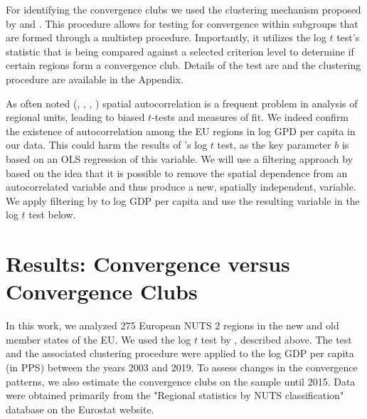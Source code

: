 \documentclass[11pt]{article}
\begin{document}
For identifying the convergence clubs we used the clustering mechanism proposed by \citet{phillips2009economic} and \citet{bartkowska2012regional}. This procedure allows for testing for convergence within subgroups that are formed through a multistep procedure. Importantly, it utilizes the log $t$ test's statistic that is being compared against a selected criterion level to determine if certain regions form a convergence club. Details of the test are and the clustering procedure are available in the Appendix.

As often noted (\citet{dall2008regional}, \citet{magrini2004regional}, \citet{anselin1991properties}, \citet{anselin2001spatial}) spatial autocorrelation is a frequent problem in analysis of regional units, leading to biased $t$-tests and measures of fit. We indeed confirm the existence of autocorrelation among the EU regions in log GPD per capita in our data. This could harm the results of \citeauthor{phillips2007transition}'s log $t$ test, as the key parameter $b$ is based on an OLS regression of this variable. We will use a filtering approach by \cite{getis2002comparative} based on the idea that it is possible to remove the spatial dependence from an autocorrelated variable and thus produce a new, spatially independent, variable. We apply filtering by \cite{getis2002comparative} to log GDP per capita and use the resulting variable in the log $t$ test below.



\section{Results: Convergence versus Convergence Clubs}
In this work, we analyzed 275 European NUTS 2 regions in the new and old member states of the EU. We used the log $t$ test by \citet{phillips2009economic}, described above. The test and the associated clustering procedure were applied to the log GDP per capita (in PPS) between the years 2003 and 2019. To assess changes in the convergence patterns, we also estimate the convergence clubs on the sample until 2015. Data were obtained primarily from the "Regional statistics by NUTS classification" database on the Eurostat website.

\end{document}
